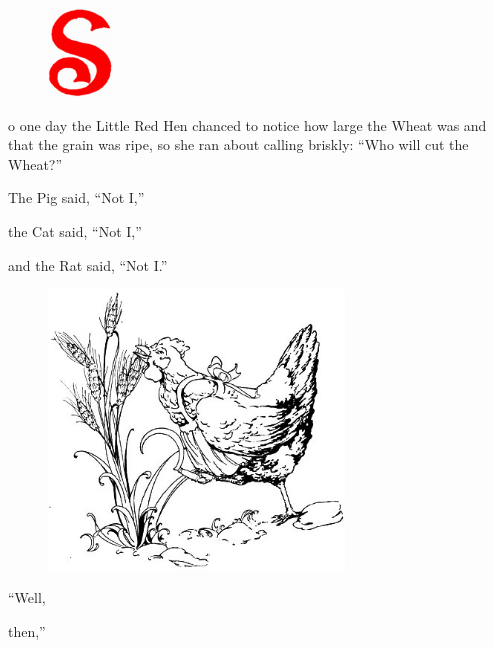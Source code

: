 \documentclass[letterpaper, 10pt, openany]{memoir}
\begin{document}
\newpage
\begin{figure}
	\includegraphics[width=0.15\textwidth]{image_017_1.jpg}
\end{figure}

o one day the Little Red Hen chanced to notice how large the Wheat was and that the grain was
ripe, so she ran about calling briskly: “Who will cut the Wheat?”

\vspace{2\onelineskip}

The Pig said, “Not I,”

the Cat said, “Not I,”

and the Rat said, “Not I.”

\begin{figure}
	\vspace{-2\onelineskip}
	\includegraphics[width=0.7\textwidth]{image_017_2.jpg}
\end{figure}

\vspace{\onelineskip}

``Well,

\vspace{\onelineskip}

then,''

\vspace{\onelineskip}
\end{document}
